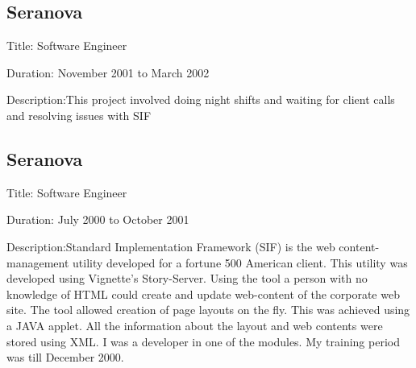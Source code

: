 \documentclass [a4paper,11pt] {article}
\begin{document}
\subsection*{Seranova}
\begin{description}
\item{Title:} Software Engineer
\item{Duration:} November 2001 to March 2002
\item{Description:}This project involved doing night shifts and waiting for client calls and resolving issues with SIF
\end{description}

\subsection*{Seranova}
\begin{description}
\item{Title:} Software Engineer
\item{Duration:} July 2000 to October 2001
\item{Description:}Standard Implementation Framework (SIF) is the web content-management utility developed for a fortune 500 American client. This utility was developed using Vignette's Story-Server. Using the tool a person with no knowledge of HTML could create and update web-content of the corporate web site.  The tool allowed creation of page layouts on the fly. This was achieved using a JAVA applet. All the information about the layout and web contents were stored using XML. I was a developer in one of the modules. My training period was till December 2000.
\end{description}
\end{document}
